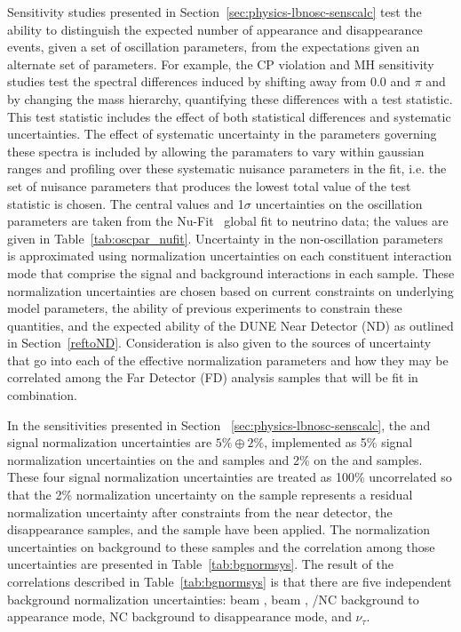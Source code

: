 Sensitivity studies presented in Section~\ref{sec:physics-lbnosc-senscalc} test the ability to distinguish
the expected number of \nue appearance and \numu disappearance events, given a set of oscillation parameters,
from the expectations given an alternate set of parameters. For example, the CP violation and MH sensitivity
studies test the spectral differences induced by shifting \deltacp away from 0.0 and $\pi$ and by changing the
mass hierarchy, quantifying these differences with a test statistic. This test statistic includes the effect of
both statistical differences and
systematic uncertainties. The effect of systematic uncertainty in the parameters governing these spectra
is included by allowing the paramaters to vary within gaussian ranges and profiling over 
these systematic nuisance parameters in the fit, i.e. the set of nuisance parameters that produces the
lowest total value of the test statistic is chosen.  The central values and 1$\sigma$ uncertainties on the oscillation
parameters are taken from the Nu-Fit~\cite{Gonzalez-Garcia:2014bfa} global fit to neutrino data; the values are
given in Table~\ref{tab:oscpar_nufit}. Uncertainty in the non-oscillation parameters is approximated using
normalization uncertainties on each constituent interaction mode that comprise the signal and background
interactions in each sample. These normalization uncertainties are chosen based on
current constraints on underlying model parameters, the ability of previous experiments to constrain
these quantities, and the expected ability of the DUNE Near Detector (ND) as outlined in Section~\ref{reftoND}.
Consideration is also given to the sources of uncertainty that go into each of the effective normalization
parameters and how they may be correlated among the Far Detector (FD) analysis samples that will be fit in
combination.

In the sensitivities presented in Section ~\ref{sec:physics-lbnosc-senscalc},
the \nue and \anue signal normalization uncertainties are $5\% \oplus 2\%$, implemented as
5\% signal normalization uncertainties on the \numu and \anumu samples and
2\% on the \nue and \anue samples. These four signal normalization uncertainties
are treated as 100\% uncorrelated so that the 2\% normalization uncertainty on the
\nue sample represents a residual normalization uncertainty after constraints
from the near detector, the \numu disappearance samples, and the \anue sample have been applied.
The normalization uncertainties on background to these samples and the correlation among those
uncertainties are presented in Table~\ref{tab:bgnormsys}. The result of the correlations
described in Table~\ref{tab:bgnormsys} is that there are five independent background
normalization uncertainties: beam \nue, beam \anue, \numu/NC background to appearance mode,
NC background to disappearance mode, and $\nu_\tau$. 

